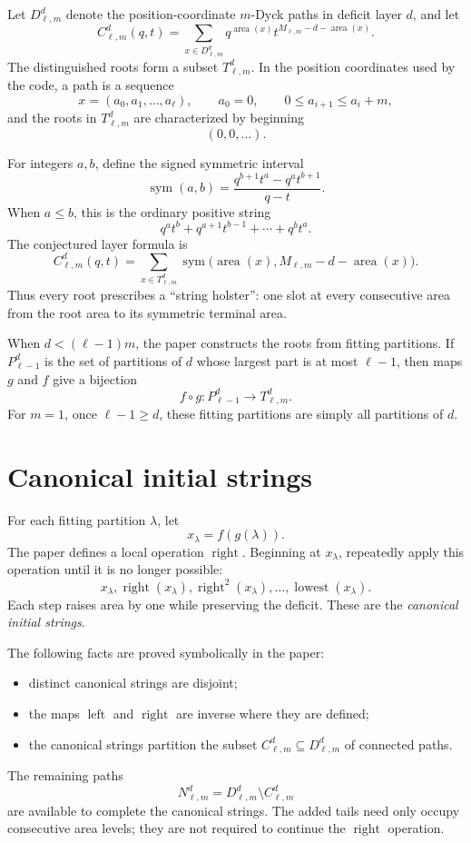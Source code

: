 \documentclass{article}
\DeclareMathOperator{\area}{area}
\DeclareMathOperator{\lowest}{lowest}
\DeclareMathOperator{\sym}{sym}
\begin{document}
Let \(D_{\ell,m}^d\) denote the position-coordinate \(m\)-Dyck paths in
deficit layer \(d\), and let
\[
  C_{\ell,m}^d(q,t)
  =
  \sum_{x\in D_{\ell,m}^d}
  q^{\area(x)}t^{M_{\ell,m}-d-\area(x)}.
\]
The distinguished roots form a subset \(T_{\ell,m}^d\).  In the position
coordinates used by the code, a path is a sequence
\[
  x=(a_0,a_1,\ldots,a_\ell),
  \qquad
  a_0=0,
  \qquad
  0\leq a_{i+1}\leq a_i+m,
\]
and the roots in \(T_{\ell,m}^d\) are characterized by beginning
\[
  (0,0,\ldots).
\]

For integers \(a,b\), define the signed symmetric interval
\[
  \sym(a,b)
  =
  \frac{q^{b+1}t^a-q^a t^{b+1}}{q-t}.
\]
When \(a\leq b\), this is the ordinary positive string
\[
  q^a t^b+q^{a+1}t^{b-1}+\cdots+q^b t^a.
\]
The conjectured layer formula is
\[
  C_{\ell,m}^d(q,t)
  =
  \sum_{x\in T_{\ell,m}^d}
  \sym\bigl(\area(x),M_{\ell,m}-d-\area(x)\bigr).
  \tag{1}
\]
Thus every root prescribes a ``string holster'': one slot at every consecutive
area from the root area to its symmetric terminal area.

When \(d<(\ell-1)m\), the paper constructs the roots from fitting partitions.
If \(P_{\ell-1}^d\) is the set of partitions of \(d\) whose largest part is at
most \(\ell-1\), then maps \(g\) and \(f\) give a bijection
\[
  f\circ g:P_{\ell-1}^d\longrightarrow T_{\ell,m}^d.
\]
For \(m=1\), once \(\ell-1\geq d\), these fitting partitions are simply all
partitions of \(d\).

\section{Canonical initial strings}

For each fitting partition \(\lambda\), let
\[
  x_\lambda=f(g(\lambda)).
\]
The paper defines a local operation \(\operatorname{right}\).  Beginning at
\(x_\lambda\), repeatedly apply this operation until it is no longer
possible:
\[
  x_\lambda,
  \operatorname{right}(x_\lambda),
  \operatorname{right}^2(x_\lambda),
  \ldots,
  \lowest(x_\lambda).
\]
Each step raises area by one while preserving the deficit.  These are the
\emph{canonical initial strings}.

The following facts are proved symbolically in the paper:
\begin{itemize}
\item distinct canonical strings are disjoint;
\item the maps \(\operatorname{left}\) and \(\operatorname{right}\) are
      inverse where they are defined;
\item the canonical strings partition the subset
      \(C_{\ell,m}^d\subseteq D_{\ell,m}^d\) of connected paths.
\end{itemize}
The remaining paths
\[
  N_{\ell,m}^d=D_{\ell,m}^d\setminus C_{\ell,m}^d
\]
are available to complete the canonical strings.  The added tails need only
occupy consecutive area levels; they are not required to continue the
\(\operatorname{right}\) operation.
\end{document}

